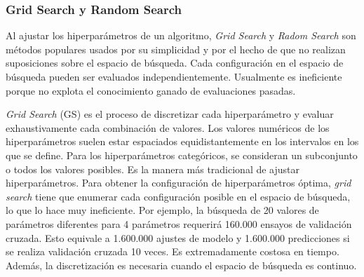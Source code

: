 \subsubsection{Grid Search y Random Search}


Al ajustar los hiperparámetros de un algoritmo, \textit{Grid Search} y \textit{Radom Search} son métodos populares usados por su simplicidad y por el hecho de que no realizan suposiciones sobre el espacio de búsqueda. Cada configuración en el espacio de búsqueda pueden ser evaluados independientemente. Usualmente es ineficiente porque no explota el conocimiento ganado de evaluaciones pasadas.

\textit{Grid Search} (GS) es el proceso de discretizar cada hiperparámetro y evaluar exhaustivamente cada combinación de valores. Los valores numéricos de los hiperparámetros suelen estar espaciados equidistantemente en los intervalos en los que se define. Para los hiperparámetros categóricos, se consideran un subconjunto o todos los valores posibles. Es la manera más tradicional de ajustar hiperparámetros. Para obtener la configuración de hiperparámetros óptima, \textit{grid search} tiene que enumerar cada configuración posible en el espacio de búsqueda, lo que lo hace muy ineficiente. Por ejemplo, la búsqueda de 20 valores de parámetros diferentes para 4 parámetros requerirá 160.000 ensayos de validación cruzada. Esto equivale a 1.600.000 ajustes de modelo y 1.600.000 predicciones si se realiza validación cruzada 10 veces. Es extremadamente costosa en tiempo. Además, la discretización es necesaria cuando el espacio de búsqueda es continuo.

